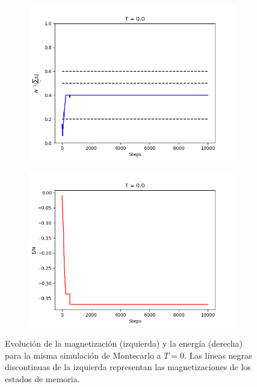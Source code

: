 \documentclass[titlepage,12pt]{article}
\numberwithin{equation}{section}
\begin{document}
	\begin{figure}[H]
	    \centering
	    \begin{subfigure}{.45\textwidth}
	    \centering
	    \includegraphics[width=\linewidth]{magnet_meta_T=0,0.png}
	    \end{subfigure}%
	    \begin{subfigure}{.45\linewidth}
	    \centering
	    \includegraphics[width=\linewidth]{ener_meta_T=0,0.png}
	    \end{subfigure}%
	    \caption{Evolución de la magnetización (izquierda) y la energía (derecha) para la misma simulación de Montecarlo a $T = 0$. Las líneas negras discontinuas de la izquierda representan las magnetizaciones de los estados de memoria.}
	    \label{meta-T=0}
	\end{figure}
\end{document}

